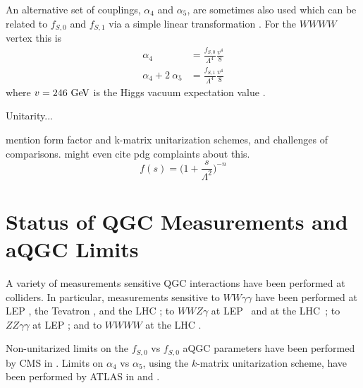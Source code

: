 An alternative set of couplings, $\alpha_4$ and $\alpha_5$, are sometimes also used
which can be related to $f_{S,0}$ and $f_{S,1}$ via a simple linear transformation \cite{Baak:2013fwa}. 
For the $WWWW$ vertex this is 
\begin{equation}
\begin{aligned}
\alpha_4 &= \frac{f_{S,0}}{\Lambda^4} \frac{v^4}{8} \\
\alpha_4 + 2~\alpha_5 &= \frac{f_{S,1}}{\Lambda^4} \frac{v^4}{8}
\end{aligned}
\label{eq:alpha45}
\end{equation}
where $v = 246 \GeV$ is the Higgs vacuum expectation value \cite{PDG:2014}.



Unitarity...

mention form factor and k-matrix unitarization schemes, and 
challenges of comparisons. might even cite pdg complaints about 
this.
%
\begin{equation}
f(s) = \Big( 1 + \frac{s}{\Lambda^2} \Big)^{-n}
\label{eq:form_factor}
\end{equation}



\section{Status of QGC Measurements and aQGC Limits}
A variety of measurements sensitive QGC interactions have been
performed at colliders. In particular, measurements sensitive
to $WW\gamma\gamma$ have been performed 
at LEP \cite{Abdallah:2003xn,PhysRevD.70.032005}, 
the Tevatron \cite{PhysRevD.88.012005}, %
and the LHC \cite{PhysRevLett.115.031802,PhysRevD.90.032008,Chatrchyan:2013akv}; 
to $WWZ\gamma$ at LEP~\cite{Achard:2001eg,Abbiendi:1999aa,Abbiendi:2003jh}
and at the LHC~\cite{PhysRevD.90.032008};
to $ZZ\gamma\gamma$ at LEP \cite{Achard:2002iz,PhysRevD.70.032005}; 
and to $WWWW$ at the LHC \cite{PhysRevLett.113.141803,PhysRevLett.114.051801}. 


Non-unitarized limits on the $f_{S,0}$ vs $f_{S,0}$ aQGC 
parameters have been performed by CMS in \cite{khachatryan:1957133}.
Limits on $\alpha_4$ vs $\alpha_5$, using the $k$-matrix unitarization
scheme, have been performed by ATLAS 
in \cite{PhysRevLett.113.141803} and \cite{Aad:2016ett}.
